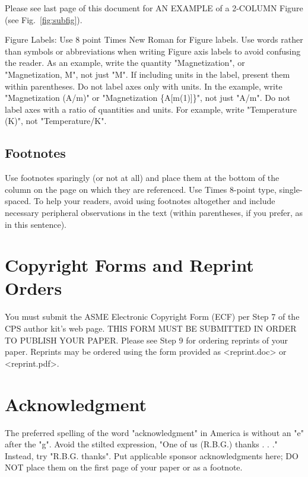 \documentclass[conference]{IEEEtran}
\begin{document}
Please see last page of this document for AN EXAMPLE of a 2-COLUMN Figure (see Fig.~\ref{fig:subfig}).

Figure Labels: Use 8 point Times New Roman for Figure labels. Use words rather than symbols or abbreviations when writing Figure axis labels to avoid confusing the reader. As an example, write the quantity "Magnetization", or "Magnetization, M", not just "M". If including units in the label, present them within parentheses. Do not label axes only with units. In the example, write "Magnetization (A/m)" or "Magnetization \{A[m(1)]\}", not just "A/m". Do not label axes with a ratio of quantities and units. For example, write "Temperature (K)", not "Temperature/K".

\subsection{Footnotes} 
Use footnotes sparingly (or not at all) and place them at the bottom of the column on the page on which they are referenced. Use Times 8-point type, single-spaced. To help your readers, avoid using footnotes altogether and include necessary peripheral observations in the text (within parentheses, if you prefer, as in this sentence).

\section{Copyright Forms and Reprint Orders} 
You must submit the ASME Electronic Copyright Form (ECF) per Step 7 of the CPS author kit’s web page. THIS FORM MUST BE SUBMITTED IN ORDER TO PUBLISH YOUR PAPER.
Please see Step 9 for ordering reprints of your paper. Reprints may be ordered using the form provided as <reprint.doc> or <reprint.pdf>.

\section*{Acknowledgment}
The preferred spelling of the word "acknowledgment" in America is without an "e" after the "g". Avoid the stilted expression, "One of us (R.B.G.) thanks . . ."  Instead, try 
"R.B.G. thanks". Put applicable sponsor acknowledgments here; DO NOT place them on the first page of your paper or as a footnote.
\end{document}

